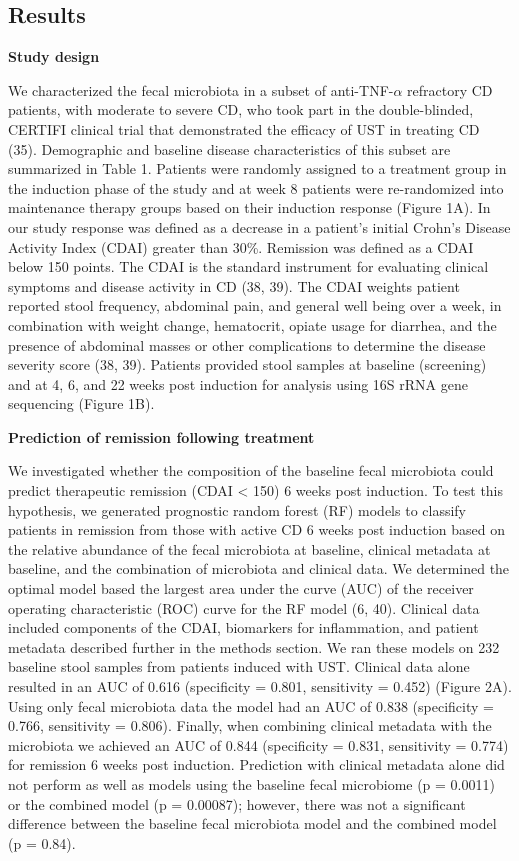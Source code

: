 \documentclass[12pt,]{article}
\begin{document}
\subsection{Results}\label{results}

\textbf{Study design}

We characterized the fecal microbiota in a subset of
anti-TNF-\({\alpha}\) refractory CD patients, with moderate to severe
CD, who took part in the double-blinded, CERTIFI clinical trial that
demonstrated the efficacy of UST in treating CD (35). Demographic and
baseline disease characteristics of this subset are summarized in Table
1. Patients were randomly assigned to a treatment group in the induction
phase of the study and at week 8 patients were re-randomized into
maintenance therapy groups based on their induction response (Figure
1A). In our study response was defined as a decrease in a patient's
initial Crohn's Disease Activity Index (CDAI) greater than 30\%.
Remission was defined as a CDAI below 150 points. The CDAI is the
standard instrument for evaluating clinical symptoms and disease
activity in CD (38, 39). The CDAI weights patient reported stool
frequency, abdominal pain, and general well being over a week, in
combination with weight change, hematocrit, opiate usage for diarrhea,
and the presence of abdominal masses or other complications to determine
the disease severity score (38, 39). Patients provided stool samples at
baseline (screening) and at 4, 6, and 22 weeks post induction for
analysis using 16S rRNA gene sequencing (Figure 1B).

\textbf{Prediction of remission following treatment}

We investigated whether the composition of the baseline fecal microbiota
could predict therapeutic remission (CDAI \textless{} 150) 6 weeks post
induction. To test this hypothesis, we generated prognostic random
forest (RF) models to classify patients in remission from those with
active CD 6 weeks post induction based on the relative abundance of the
fecal microbiota at baseline, clinical metadata at baseline, and the
combination of microbiota and clinical data. We determined the optimal
model based the largest area under the curve (AUC) of the receiver
operating characteristic (ROC) curve for the RF model (6, 40). Clinical
data included components of the CDAI, biomarkers for inflammation, and
patient metadata described further in the methods section. We ran these
models on 232 baseline stool samples from patients induced with UST.
Clinical data alone resulted in an AUC of 0.616 (specificity = 0.801,
sensitivity = 0.452) (Figure 2A). Using only fecal microbiota data the
model had an AUC of 0.838 (specificity = 0.766, sensitivity = 0.806).
Finally, when combining clinical metadata with the microbiota we
achieved an AUC of 0.844 (specificity = 0.831, sensitivity = 0.774) for
remission 6 weeks post induction. Prediction with clinical metadata
alone did not perform as well as models using the baseline fecal
microbiome (p = 0.0011) or the combined model (p = 0.00087); however,
there was not a significant difference between the baseline fecal
microbiota model and the combined model (p = 0.84).
\end{document}
